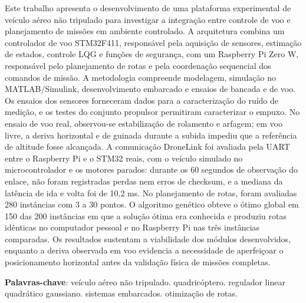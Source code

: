 \setlength{\absparsep}{18pt}
\begin{resumo}
\SingleSpacing
{\setlength{\parindent}{1.27cm}\par\noindent\hspace*{\parindent}Este trabalho apresenta o desenvolvimento de uma plataforma experimental de veículo aéreo não tripulado para investigar a integração entre controle de voo e planejamento de missões em ambiente controlado. A arquitetura combina um controlador de voo STM32F411, responsável pela aquisição de sensores, estimação de estados, controle LQG e funções de segurança, com um Raspberry Pi Zero W, responsável pelo planejamento de rotas e pela coordenação sequencial dos comandos de missão. A metodologia compreende modelagem, simulação no MATLAB/Simulink, desenvolvimento embarcado e ensaios de bancada e de voo. Os ensaios dos sensores forneceram dados para a caracterização do ruído de medição, e os testes do conjunto propulsor permitiram caracterizar o empuxo. No ensaio de voo real, observou-se estabilização de rolamento e arfagem; em voo livre, a deriva horizontal e de guinada durante a subida impediu que a referência de altitude fosse alcançada. A comunicação DroneLink foi avaliada pela UART entre o Raspberry Pi e o STM32 reais, com o veículo simulado no microcontrolador e os motores parados: durante os 60 segundos de observação do enlace, não foram registradas perdas nem erros de checksum, e a mediana da latência de ida e volta foi de 10,2 ms. No planejamento de rotas, foram avaliadas 280 instâncias com 3 a 30 pontos. O algoritmo genético obteve o ótimo global em 150 das 200 instâncias em que a solução ótima era conhecida e produziu rotas idênticas no computador pessoal e no Raspberry Pi nas três instâncias comparadas. Os resultados sustentam a viabilidade dos módulos desenvolvidos, enquanto a deriva observada em voo evidencia a necessidade de aperfeiçoar o posicionamento horizontal antes da validação física de missões completas.\par}

\noindent\textbf{Palavras-chave}: veículo aéreo não tripulado. quadricóptero. regulador linear quadrático gaussiano. sistemas embarcados. otimização de rotas.
\end{resumo}

